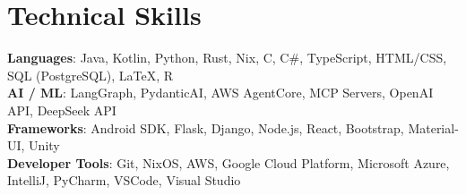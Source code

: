 \section{Technical Skills}
 \begin{itemize}[leftmargin=0.15in, label={}]
    \small{\item{
     \textbf{Languages}{: Java, Kotlin, Python, Rust, Nix, C, C\#, TypeScript, HTML/CSS, SQL (PostgreSQL), \LaTeX, R} \\
     \textbf{AI / ML}{: LangGraph, PydanticAI, AWS AgentCore, MCP Servers, OpenAI API, DeepSeek API} \\
     \textbf{Frameworks}{: Android SDK, Flask, Django, Node.js, React, Bootstrap, Material-UI, Unity} \\
     \textbf{Developer Tools}{: Git, NixOS, AWS, Google Cloud Platform, Microsoft Azure, IntelliJ, PyCharm, VSCode, Visual Studio} \\
    }}
 \end{itemize}
